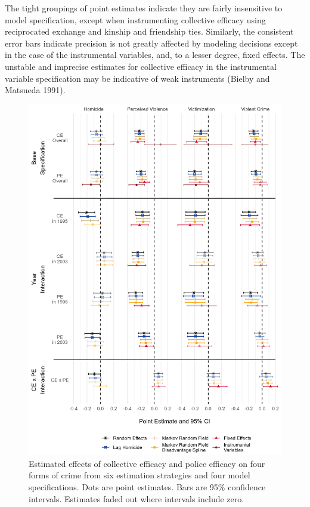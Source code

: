 \documentclass [11pt, proquest] {uwthesis}[2015/03/03]
\begin{document}
The tight groupings of point estimates indicate they are fairly insensitive to model specification, except when instrumenting collective efficacy using reciprocated exchange and kinship and friendship ties. Similarly, the consistent error bars indicate precision is not greatly affected by modeling decisions except in the case of the instrumental variables, and, to a lesser degree, fixed effects. The unstable and imprecise estimates for collective efficacy in the instrumental variable specification may be indicative of weak instruments (Bielby and Matsueda 1991).\linebreak
\linebreak
\begin{figure}

{\centering \includegraphics[width=0.8\linewidth]{./figure/ch3/ce_pe_plot_vertical} 

}

\caption[Estimated effects of collective efficacy and police efficacy on four forms of crime from six estimation strategies and four model specifications.]{Estimated effects of collective efficacy and police efficacy on four forms of crime from six estimation strategies and four model specifications. Dots are point estimates. Bars are 95\% confidence intervals. Estimates faded out where intervals include zero.}\label{fig:fccoefplot}
\end{figure}
\end{document}
